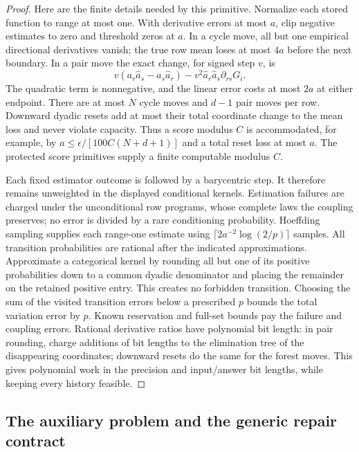 \begin{proof}
Here are the finite details needed by this primitive.  Normalize each
stored function to range at most one.  With derivative errors at most
$a$, clip negative estimates to zero and threshold zeros at $a$.
In a cycle move, all but one empirical directional derivatives vanish;
the true row mean loses at most $4a$ before the next boundary.
In a pair move the exact change, for signed step $v$, is
\[
 v(a_r\widehat a_s-a_s\widehat a_r)
   -v^2\widehat a_r\widehat a_s\partial_{rs}G_i.
\]
The quadratic term is nonnegative, and the linear error costs at most
$2a$ at either endpoint.  There are at most $N$ cycle moves and $d-1$
pair moves per row.  Downward dyadic resets add at most their total
coordinate change to the mean loss and never violate capacity.
Thus a score modulus $C$ is accommodated, for example, by
$a\le\epsilon/[100C(N+d+1)]$ and a total reset loss at most $a$.
The protected score primitives supply a finite computable modulus $C$.

Each fixed estimator outcome is followed by a barycentric step.
It therefore remains unweighted in the displayed conditional kernels.
Estimation failures are charged under the unconditional row programs,
whose complete laws the coupling preserves; no error is divided by a
rare conditioning probability.  Hoeffding sampling supplies each
range-one estimate using $\lceil2a^{-2}\log(2/p)\rceil$ samples.
All transition probabilities are rational after the indicated
approximations.  Approximate a categorical kernel by rounding all but
one of its positive probabilities down to a common dyadic denominator
and placing the remainder on the retained positive entry.  This creates
no forbidden transition.  Choosing the sum of the visited transition
errors below a prescribed $p$ bounds the total variation error by $p$.
Known reservation and full-set bounds pay the failure and coupling
errors.  Rational derivative ratios have polynomial bit length: in
pair rounding, charge additions of bit lengths to the elimination
tree of the disappearing coordinates; downward resets do the same
for the forest moves.  This gives polynomial work in the precision
and input/answer bit lengths, while keeping every history feasible.
\end{proof}

\subsection{The auxiliary problem and the generic repair contract}

